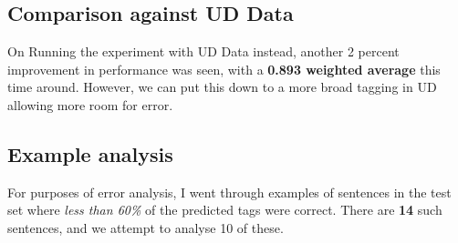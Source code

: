 \documentclass[a4 paper]{article}
\begin{document}
\subsection{Comparison against UD Data}
On Running the experiment with UD Data instead, another 2 percent improvement
in performance was seen, with a \textbf{0.893 weighted average} this time around.
However, we can put this down to a more broad tagging in UD allowing more room
for error.\\

\subsection{Example analysis}
For purposes of error analysis, I went through examples of sentences in the 
test set where \textit{less than 60\%} of the predicted tags were correct. There
are \textbf{14} such sentences, and we attempt to analyse 10 of these.
\end{document}
